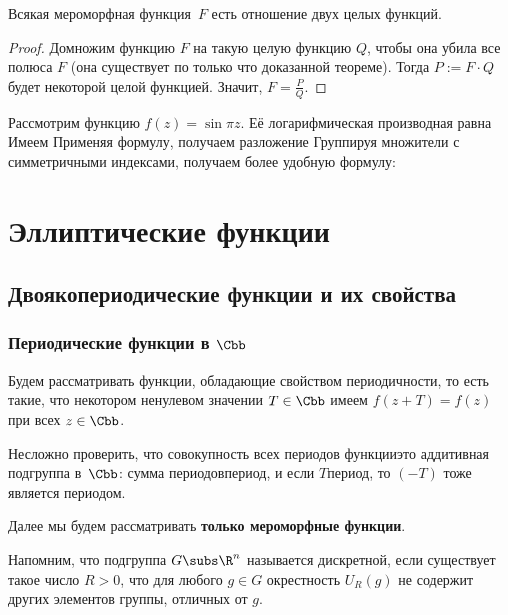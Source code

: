 \documentclass[a4paper]{article}
\begin{document}
\begin{imp}
Всякая мероморфная функция~$F$ есть отношение двух целых функций.
\end{imp}
\begin{proof}
Домножим функцию $F$ на такую целую функцию $Q$, чтобы она убила все полюса $F$
(она существует по только что доказанной теореме).
Тогда $P := F\cdot Q$ будет некоторой целой функцией. Значит, $F = \frac P Q$.
\end{proof}

\begin{ex}
Рассмотрим функцию $f(z) = \sin \pi z$. Её логарифмическая производная равна
Имеем
Применяя формулу, получаем разложение
Группируя множители с симметричными индексами, получаем более удобную формулу:
\end{ex}

\section{Эллиптические функции}

\subsection{Двоякопериодические функции и их свойства}

\subsubsection{Периодические функции в $\Cbb$}

Будем рассматривать функции, обладающие свойством периодичности, то есть такие,
что некотором ненулевом значении $T \in \Cbb$ имеем $f(z + T) = f(z)$ при всех $z \in \Cbb$.

Несложно проверить, что совокупность всех периодов функции\т это аддитивная подгруппа в~$\Cbb$:
сумма периодов\т период, и если $T$\т период, то $(-T)$ тоже является периодом.

Далее мы будем рассматривать \textbf{только мероморфные функции}.

Напомним, что подгруппа $G \subs \R^n$ называется дискретной, если существует такое число $R>0$,
что для любого $g \in G$ окрестность $U_R(g)$ не содержит других элементов группы, отличных от $g$.
\end{document}
